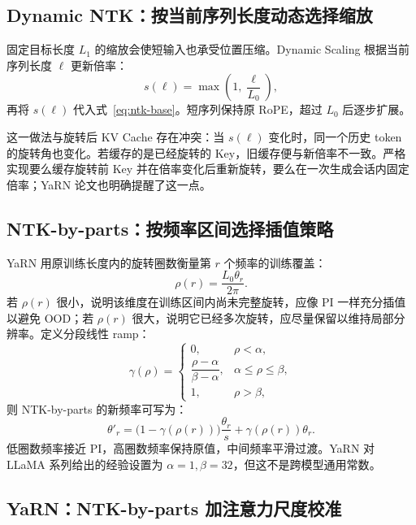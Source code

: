 \documentclass[UTF8,fontset=none,a4paper,10pt]{ctexart}
\begin{document}
\subsection{Dynamic NTK：按当前序列长度动态选择缩放}

固定目标长度 $L_1$ 的缩放会使短输入也承受位置压缩。Dynamic Scaling 根据当前序列长度 $\ell$ 更新倍率\cite{peng2024yarn}：
\begin{equation}
  s(\ell)=\max\left(1,\frac{\ell}{L_0}\right),
  \label{eq:dynamic-scale}
\end{equation}
再将 $s(\ell)$ 代入式~\eqref{eq:ntk-base}。短序列保持原 RoPE，超过 $L_0$ 后逐步扩展。

这一做法与旋转后 KV Cache 存在冲突：当 $s(\ell)$ 变化时，同一个历史 token 的旋转角也变化。若缓存的是已经旋转的 Key，旧缓存便与新倍率不一致。严格实现要么缓存旋转前 Key 并在倍率变化后重新旋转，要么在一次生成会话内固定倍率；YaRN 论文也明确提醒了这一点\cite{peng2024yarn}。

\subsection{NTK-by-parts：按频率区间选择插值策略}

YaRN 用原训练长度内的旋转圈数衡量第 $r$ 个频率的训练覆盖：
\begin{equation}
  \rho(r)=\frac{L_0\theta_r}{2\pi}.
  \label{eq:rotation-count}
\end{equation}
若 $\rho(r)$ 很小，说明该维度在训练区间内尚未完整旋转，应像 PI 一样充分插值以避免 OOD；若 $\rho(r)$ 很大，说明它已经多次旋转，应尽量保留以维持局部分辨率。定义分段线性 ramp：
\begin{equation}
  \gamma(\rho)=
  \begin{cases}
    0,&\rho<\alpha,\\
    \dfrac{\rho-\alpha}{\beta-\alpha},&\alpha\le\rho\le\beta,\\
    1,&\rho>\beta,
  \end{cases}
  \label{eq:ramp}
\end{equation}
则 NTK-by-parts 的新频率可写为：
\begin{equation}
  \theta'_r=
  \bigl(1-\gamma(\rho(r))\bigr)\frac{\theta_r}{s}
  +\gamma(\rho(r))\theta_r.
  \label{eq:ntk-by-parts}
\end{equation}
低圈数频率接近 PI，高圈数频率保持原值，中间频率平滑过渡。YaRN 对 LLaMA 系列给出的经验设置为 $\alpha=1,\beta=32$，但这不是跨模型通用常数\cite{peng2024yarn}。

\subsection{YaRN：NTK-by-parts 加注意力尺度校准}
\end{document}
